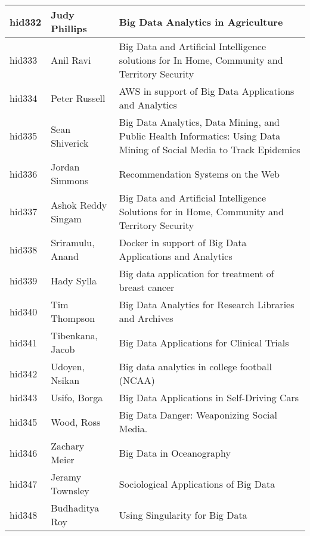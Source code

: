 \documentclass[12pt]{book}
\begin{document}
\begin{footnotesize}
\begin{longtable}{|p{1cm}p{5cm}p{9cm}|}
\hline
hid332 & Judy Phillips & Big Data Analytics in Agriculture  \\
\hline
hid333 & Anil Ravi & Big Data and Artificial Intelligence solutions for In Home, Community and Territory Security  \\
\hline
hid334 & Peter Russell & AWS in support of Big Data Applications and Analytics  \\
\hline
hid335 & Sean Shiverick & Big Data Analytics, Data Mining, and Public Health Informatics:  Using Data Mining of Social Media to Track Epidemics
  \\
\hline
hid336 & Jordan Simmons & Recommendation Systems on the Web  \\
\hline
hid337 & Ashok Reddy Singam & Big Data and Artificial Intelligence Solutions for in Home, Community and Territory Security
  \\
\hline
hid338 & Sriramulu, Anand & Docker in support of Big Data Applications and Analytics  \\
\hline
hid339 & Hady Sylla & Big data application for treatment of breast cancer  \\
\hline
hid340 & Tim Thompson & Big Data Analytics for Research Libraries and Archives  \\
\hline
hid341 & Tibenkana, Jacob & Big Data Applications for Clinical Trials  \\
\hline
hid342 & Udoyen, Nsikan & Big data analytics in college football (NCAA)  \\
\hline
hid343 & Usifo, Borga & Big Data Applications in Self-Driving Cars  \\
\hline
hid345 & Wood, Ross & Big Data Danger: Weaponizing Social Media.  \\
\hline
hid346 & Zachary Meier & Big Data in Oceanography  \\
\hline
hid347 & Jeramy Townsley & Sociological Applications of Big Data  \\
\hline
hid348 & Budhaditya Roy & Using Singularity for Big Data  \\
\hline
\end{longtable}
\end{footnotesize}
\newpage
\end{document}

